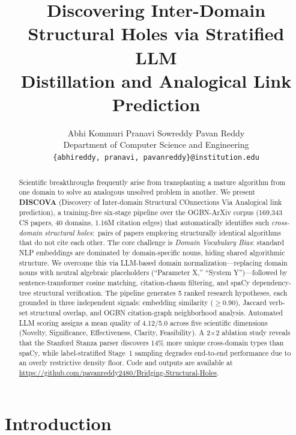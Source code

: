 \documentclass[11pt]{article}
\title{Discovering Inter-Domain Structural Holes via Stratified LLM\\
Distillation and Analogical Link Prediction}
\author{
  Abhi Kommuri \quad Pranavi Sowreddy \quad Pavan Reddy \\
  Department of Computer Science and Engineering \\
  \texttt{\{abhireddy, pranavi, pavanreddy\}@institution.edu}
}
\begin{document}
\maketitle

\begin{abstract}
Scientific breakthroughs frequently arise from transplanting a mature
algorithm from one domain to solve an analogous unsolved problem in another.
We present \textbf{DISCOVA} (Discovery of Inter-domain Structural COnnections
Via Analogical link prediction), a training-free six-stage pipeline over the
OGBN-ArXiv corpus (169,343 CS papers, 40 domains, 1.16M citation edges) that
automatically identifies such \emph{cross-domain structural holes}:\ pairs of
papers employing structurally identical algorithms that do not cite each other.
The core challenge is \emph{Domain Vocabulary Bias}: standard NLP embeddings
are dominated by domain-specific nouns, hiding shared algorithmic structure.
We overcome this via LLM-based domain normalization---replacing domain nouns
with neutral algebraic placeholders (``Parameter X,'' ``System Y'')---followed
by sentence-transformer cosine matching, citation-chasm filtering, and spaCy
dependency-tree structural verification.
The pipeline generates 5 ranked research hypotheses, each grounded in three
independent signals: embedding similarity ($\geq$0.90), Jaccard verb-set
structural overlap, and OGBN citation-graph neighborhood analysis.
Automated LLM scoring assigns a mean quality of 4.12/5.0 across five
scientific dimensions (Novelty, Significance, Effectiveness, Clarity,
Feasibility). A 2$\times$2 ablation study reveals that the Stanford Stanza
parser discovers 14\% more unique cross-domain types than spaCy, while
label-stratified Stage~1 sampling degrades end-to-end performance due to an
overly restrictive density floor.
Code and outputs are available at
\url{https://github.com/pavanreddy2480/Bridging-Structural-Holes}.
\end{abstract}

\twocolumn
\setlength{\parskip}{4pt plus 1pt}

\section{Introduction}
\end{document}
